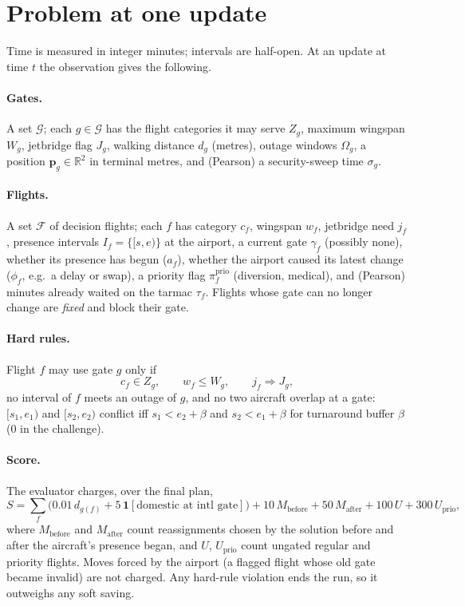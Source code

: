 \documentclass[11pt]{article}
\theoremstyle{remark}
\newcommand{\R}{\mathbb{R}}
\newcommand{\G}{\mathcal{G}}
\newcommand{\F}{\mathcal{F}}
\newcommand{\ind}[1]{\mathbf{1}\!\left[#1\right]}
\begin{document}
\section{Problem at one update}\label{sec:problem}
Time is measured in integer minutes; intervals are half-open. At an update at time $t$ the
observation gives the following.

\paragraph{Gates.} A set $\G$; each $g\in\G$ has the flight categories it may serve $Z_g$, maximum
wingspan $W_g$, jetbridge flag $J_g$, walking distance $d_g$ (metres), outage windows $\Omega_g$,
a position $\mathbf{p}_g\in\R^2$ in terminal metres, and (Pearson) a security-sweep time $\sigma_g$.

\paragraph{Flights.} A set $\F$ of decision flights; each $f$ has category $c_f$, wingspan $w_f$,
jetbridge need $j_f$, presence intervals $I_f=\{[s,e)\}$ at the airport, a current gate $\gamma_f$
(possibly none), whether its presence has begun ($a_f$), whether the airport caused its latest
change ($\phi_f$, e.g.\ a delay or swap), a priority flag $\pi^{\mathrm{prio}}_f$ (diversion,
medical), and (Pearson) minutes already waited on the tarmac $\tau_f$. Flights whose gate can no
longer change are \emph{fixed} and block their gate.

\paragraph{Hard rules.} Flight $f$ may use gate $g$ only if
\begin{equation}
c_f\in Z_g,\qquad w_f\le W_g,\qquad j_f\Rightarrow J_g,
\label{eq:compat}
\end{equation}
no interval of $f$ meets an outage of $g$, and no two aircraft overlap at a gate:
$[s_1,e_1)$ and $[s_2,e_2)$ conflict iff $s_1<e_2+\beta$ and $s_2<e_1+\beta$ for turnaround buffer
$\beta$ (0 in the challenge).

\paragraph{Score.} The evaluator charges, over the final plan,
\begin{equation}
S=\sum_{f}\Big(0.01\,d_{g(f)} + 5\,\ind{\text{domestic at intl gate}}\Big)
 + 10\,M_{\text{before}} + 50\,M_{\text{after}} + 100\,U + 300\,U_{\text{prio}},
\label{eq:score}
\end{equation}
where $M_{\text{before}}$ and $M_{\text{after}}$ count reassignments chosen by the solution before and
after the aircraft's presence began, and $U$, $U_{\text{prio}}$ count ungated regular and priority
flights. Moves forced by the airport (a flagged flight whose old gate became invalid) are not
charged. Any hard-rule violation ends the run, so it outweighs any soft saving.
\end{document}
